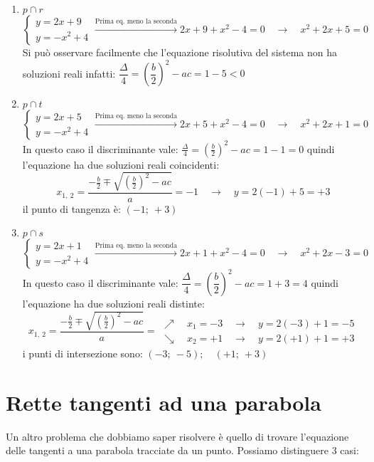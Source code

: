 \begin{enumerate}
 \item \(p \cap r\)
\[\left\{\begin{array}{l}
  y=2x+9\\
  y=-x^2+4
\end{array}\right. \xrightarrow{\text{Prima eq. meno la seconda}}
2x+9+x^2-4=0 \quad \rightarrow \quad x^2+2x+5=0\]
 Si può osservare facilmente che l'equazione risolutiva del sistema non ha
 soluzioni reali infatti:
 \(\dfrac{\Delta}{4}=\left(\dfrac{b}{2}\right)^2-ac= 1-5 < 0\)
 \item \(p \cap t\)
\[\left\{\begin{array}{l}
  y=2x+5\\
  y=-x^2+4
\end{array}\right. \xrightarrow{\text{Prima eq. meno la seconda}}
2x+5+x^2-4=0 \quad \rightarrow \quad x^2+2x+1=0\]
 In questo caso il discriminante vale:
 \(\frac{\Delta}{4}=\left(\frac{b}{2}\right)^2-ac= 1-1 = 0\)
 quindi l'equazione ha due soluzioni reali coincidenti:
 \[x_{1,~2}=\dfrac{-\frac{b}{2} \mp \sqrt{\left(\frac{b}{2}\right)^2-ac}}{a}=
 -1 \quad \rightarrow \quad y=2(-1)+5=+3\]
 il punto di tangenza è: \((-1;~+3)\)
 \item \(p \cap s\)
\[\left\{\begin{array}{l}
  y=2x+1\\
  y=-x^2+4
\end{array}\right. \xrightarrow{\text{Prima eq. meno la seconda}}
2x+1+x^2-4=0 \quad \rightarrow \quad x^2+2x-3=0\]
 In questo caso il discriminante vale:
 \(\dfrac{\Delta}{4}=\left(\dfrac{b}{2}\right)^2-ac= 1+3 = 4\)
 quindi l'equazione ha due soluzioni reali distinte:
 \[x_{1,~2}=\dfrac{-\frac{b}{2} \mp \sqrt{\left(\frac{b}{2}\right)^2-ac}}{a}=
 \begin{array}{l}
  \nearrow \quad x_1=-3 \quad \rightarrow \quad y=2(-3)+1=-5\\
  \searrow \quad x_2=+1 \quad \rightarrow \quad y=2(+1)+1=+3
 \end{array}\]
 i punti di intersezione sono: \((-3;~-5); \quad (+1;~+3)\)
\end{enumerate}

\section{Rette tangenti ad una parabola}
\label{sec:parabola_altreparabole}

Un altro problema che dobbiamo saper risolvere è quello di trovare
l'equazione delle tangenti a una parabola tracciate da un punto.
Possiamo distinguere 3 casi:

